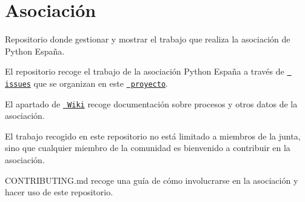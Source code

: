 \chapter{Asociación}
\hypertarget{md__e_j1_markdown}{}\label{md__e_j1_markdown}
\label{md__e_j1_markdown_autotoc_md0}%
%


Repositorio donde gestionar y mostrar el trabajo que realiza la asociación de Python España.

El repositorio recoge el trabajo de la asociación Python España a través de \href{https://github.com/python-spain/asociacion/issues}{\texttt{ issues}} que se organizan en este \href{https://github.com/python-spain/asociacion/projects/3}{\texttt{ proyecto}}.

El apartado de \href{https://github.com/python-spain/asociacion/wiki}{\texttt{ Wiki}} recoge documentación sobre procesos y otros datos de la asociación.

El trabajo recogido en este repositorio no está limitado a miembros de la junta, sino que cualquier miembro de la comunidad es bienvenido a contribuir en la asociación.

CONTRIBUTING.\+md recoge una guía de cómo involucrarse en la asociación y hacer uso de este repositorio. 